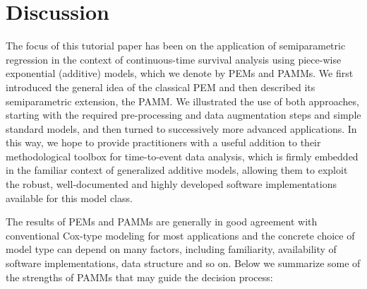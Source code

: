 \documentclass[submit]{smj}
\begin{document}
\section{Discussion}
The focus of this tutorial paper has been on the application of
semiparametric regression in the context of continuous-time survival analysis
using piece-wise exponential (additive) models, which we denote by PEMs and PAMMs.
We first introduced the general idea of the classical PEM and then described its semiparametric extension, the PAMM.
We illustrated the use of both approaches, starting with the required
pre-processing and data augmentation steps and simple standard models, and then  turned to
successively more advanced applications.
In this way, we hope to provide practitioners with a useful addition to their
methodological toolbox for time-to-event data analysis, which is firmly embedded
in the familiar context of generalized additive models, allowing them to exploit
the robust, well-documented and highly developed software implementations
available for this model class.

The results of PEMs and PAMMs are generally in good agreement with
conventional Cox-type modeling for most applications and the concrete choice
of model type can depend on many factors, including familiarity, availability
of software implementations, data structure and so on. Below we summarize some
of the strengths of PAMMs that may guide the decision process:
\end{document}
